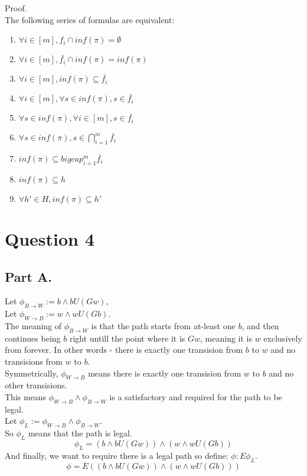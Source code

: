 \documentclass{article}
\begin{document}
Proof.\\
The following series of formulas are equivalent:
\begin{enumerate}
    \item $\forall i\in[m], f_i\cap inf(\pi)=\emptyset$
    \item $\forall i\in[m], \bar{f_i}\cap inf(\pi)=inf(\pi)$
    \item $\forall i\in[m], inf(\pi)\subseteq \bar{f_i}$
    \item $\forall i\in[m], \forall s\in inf(\pi),s\in\bar{f_i}$
    \item $\forall s\in inf(\pi), \forall i\in[m],s\in\bar{f_i}$
    \item $\forall s\in inf(\pi), s\in\bigcap_{i=1}^m\bar{f_i}$
    \item $inf(\pi)\subseteq bigcap_{i=1}^m\bar{f_i}$
    \item $inf(\pi)\subseteq h$
    \item $\forall h'\in H, inf(\pi)\subseteq h'$
\end{enumerate}

\section*{Question 4}
\subsection*{Part A.}
Let $\phi_{B\rightarrow W}:=b\wedge bU(Gw)$,\\
Let $\phi_{W\rightarrow B}:=w\wedge wU(Gb)$.\\
The meaning of $\phi_{B\rightarrow W}$ is that the 
path starts from at-least one $b$, and then continues
being $b$ right untill the point where it is $Gw$, meaning it
is $w$ exclusively from forever. In other words - 
there is exactly one transision from $b$ to $w$ and no
transisions from $w$ to $b$.\\
Symmetrically, $\phi_{W\rightarrow B}$ means there is
exactly one transision from $w$ to $b$ and no other transisions.\\
This means $\phi_{W\rightarrow B}\wedge \phi_{B\rightarrow W}$ is a 
satisfactory and required for the path to be legal.\\
Let $\phi_L:=\phi_{W\rightarrow B}\wedge \phi_{B\rightarrow W}$.\\
So $\phi_L$ means that the path is legal.\\
\[
    \phi_L=(b\wedge bU(Gw))\wedge (w\wedge wU(Gb))    
\]
And finally, we want to require there is a legal path so define:
$\phi:E\phi_L$.\\
\[
    \phi=E((b\wedge bU(Gw))\wedge (w\wedge wU(Gb)))
\]
\end{document}
